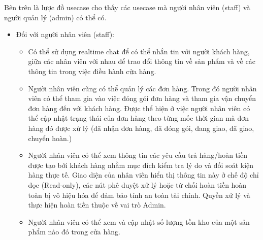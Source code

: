 Bên trên là lược đồ usecase cho thấy các usecase mà người nhân viên (staff) và người quản lý (admin) có thể có.
\begin{itemize}

  \item Đối với người nhân viên (staff):
        \begin{itemize}
          \item Có thể sử dụng realtime chat để có thể nhắn tin với người khách hàng, giữa các nhân viên với nhau để trao đổi thông tin về sản phẩm và về các thông tin trong việc điều hành cửa hàng.
          \item Người nhân viên cũng có thể quản lý các đơn hàng. Trong đó người nhân viên có thể tham gia vào việc đóng gói đơn hàng và tham gia vận chuyển đơn hàng đến với khách hàng. Được thể hiện ở việc người nhân viên có thể cập nhật trạng thái của đơn hàng theo từng mốc thời gian mà đơn hàng đó được xử lý (đã nhận đơn hàng, đã đóng gói, đang giao, đã giao, chuyển hoàn.)
          \item Người nhân viên có thể xem thông tin các yêu cầu trả hàng/hoàn tiền được tạo bởi khách hàng nhằm mục đích kiểm tra lý do và đối soát kiện hàng thực tế. Giao diện của nhân viên hiển thị thông tin này ở chế độ chỉ đọc (Read-only), các nút phê duyệt xử lý hoặc từ chối hoàn tiền hoàn toàn bị vô hiệu hóa để đảm bảo tính an toàn tài chính. Quyền xử lý và thực hiện hoàn tiền thuộc về vai trò Admin.
          \item Người nhân viên có thể xem và cập nhật số lượng tồn kho của một sản phẩm nào đó trong cửa hàng.
        \end{itemize}


\end{itemize}
